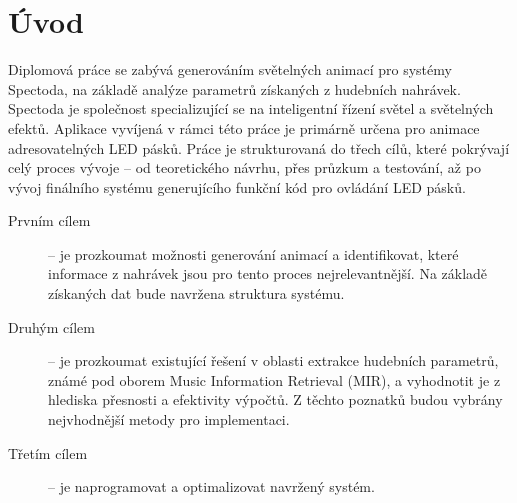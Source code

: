\chapter*{Úvod}
{}

Diplomová práce se zabývá generováním světelných animací pro systémy Spectoda, na základě analýze parametrů získaných z hudebních nahrávek. Spectoda je společnost specializující se na inteligentní řízení světel a světelných efektů. Aplikace vyvíjená v rámci této práce je primárně určena pro animace adresovatelných LED pásků. Práce je strukturovaná do třech cílů, které pokrývají celý proces vývoje -- od teoretického návrhu, přes průzkum a testování, až po vývoj finálního systému generujícího funkční kód pro ovládání LED pásků.

\begin{description}
    \item[Prvním cílem] -- je prozkoumat možnosti generování animací a identifikovat, které informace z nahrávek jsou pro tento proces nejrelevantnější. Na základě získaných dat bude navržena struktura systému.
    \item[Druhým cílem] -- je prozkoumat existující řešení v oblasti extrakce hudebních parametrů, známé pod oborem Music Information Retrieval (MIR), a vyhodnotit je z hlediska přesnosti a efektivity výpočtů. Z těchto poznatků budou vybrány nejvhodnější metody pro implementaci.
    \item[Třetím cílem] -- je naprogramovat a optimalizovat navržený systém. 
\end{description}




